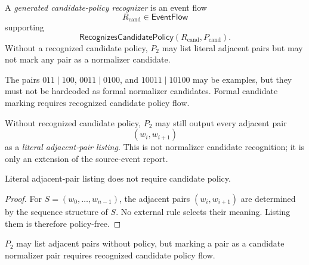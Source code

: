 \begin{definition}
\label{def:source-normalizer-candidate-policy-recognizer}
A \emph{generated candidate-policy recognizer} is an event flow
$$
  R_{\mathrm{cand}}\in\mathsf{EventFlow}
$$
supporting
$$
  \mathsf{RecognizesCandidatePolicy}(R_{\mathrm{cand}},P_{\mathrm{cand}}).
$$
Without a recognized candidate policy, $P_2$ may list literal adjacent pairs but may not mark any pair as a normalizer candidate.
\end{definition}

\begin{principle}
\label{prin:source-normalizer-no-hardcoded-table}
The pairs $011\mid 100$, $0011\mid 0100$, and $10011\mid 10100$ may be examples, but they must not be hardcoded as formal normalizer candidates. Formal candidate marking requires recognized candidate policy flow.
\end{principle}

\begin{definition}
\label{def:source-normalizer-literal-listing}
Without recognized candidate policy, $P_2$ may still output every adjacent pair
$$
  (w_i,w_{i+1})
$$
as a \emph{literal adjacent-pair listing}. This is not normalizer candidate recognition; it is only an extension of the source-event report.
\end{definition}

\begin{proposition}
\label{prop:source-normalizer-literal-listing-policy-free}
Literal adjacent-pair listing does not require candidate policy.
\end{proposition}

\begin{proof}
For $S=(w_0,\ldots,w_{n-1})$, the adjacent pairs $(w_i,w_{i+1})$ are determined by the sequence structure of $S$. No external rule selects their meaning. Listing them is therefore policy-free.
\end{proof}

\begin{corollary}
\label{cor:source-normalizer-candidate-marking-requires-policy}
$P_2$ may list adjacent pairs without policy, but marking a pair as a candidate normalizer pair requires recognized candidate policy flow.
\end{corollary}

